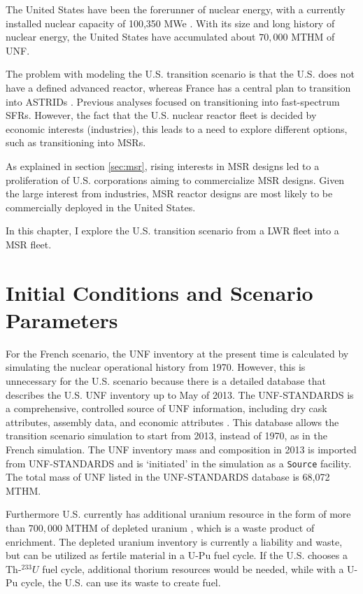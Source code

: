 
The United States have been the forerunner of nuclear energy, with a currently 
installed nuclear capacity of 100,350 \gls{MWe} \cite{iaea_nuclear_2017}.
With its size and long history of nuclear
energy, the United States have accumulated about $70,000$ \gls{MTHM} of \gls{UNF}.

The problem with modeling the U.S. transition scenario is that the U.S. does not have
a defined advanced reactor, whereas France has a central plan to transition into \glspl{ASTRID} \cite{boullis_french_2015, varaine_pre-conceptual_2012}.
Previous analyses \cite{worrall_utilization_2013, sunny_transition_2015} focused on transitioning into
fast-spectrum \glspl{SFR}.
However, the fact that the U.S. nuclear reactor fleet
is decided by economic interests (industries), this leads to
a need to explore different options, such as transitioning into \glspl{MSR}.

As explained in section \ref{sec:msr}, rising interests in \gls{MSR} designs
led to a proliferation of U.S. corporations aiming to commercialize
\gls{MSR} designs. Given the large interest from industries,
\gls{MSR} reactor designs are
most likely to be commercially deployed in the United States.

In this chapter, I explore the U.S. transition scenario
from a \gls{LWR} fleet into a \gls{MSR} fleet.

\section{Initial Conditions and Scenario Parameters}

For the French scenario, the \gls{UNF} inventory at the present
time is calculated by simulating the nuclear operational history from 1970.
However, this is unnecessary for the U.S. scenario because there is a 
detailed database that describes the U.S. \gls{UNF} inventory up to May of 2013.
The \gls{UNF-STANDARDS} is a comprehensive,
controlled source of \gls{UNF} information, including dry cask attributes, assembly
data, and economic attributes \cite{peterson_unf-st&dards_2017}. This database
allows the transition scenario simulation to start from 2013, instead of 1970,
as in the French simulation. The \gls{UNF} inventory mass and composition in 2013
is imported from \gls{UNF-STANDARDS} and is `initiated' in the simulation
as a \texttt{Source} facility. The total mass of \gls{UNF} listed
in the \gls{UNF-STANDARDS} database is 68,072 MTHM.

Furthermore U.S. currently has additional uranium resource in the
form of more than $700,000$ MTHM of depleted uranium \cite{office_nuclear_2011},
which is a waste product of enrichment. The depleted uranium inventory
is currently a liability and waste, but can be utilized as fertile material
in a U-Pu fuel cycle. If the U.S. chooses a Th-$^233U$ fuel cycle,
additional thorium resources would be needed, while with a U-Pu cycle, the
U.S. can use its waste to create fuel.

